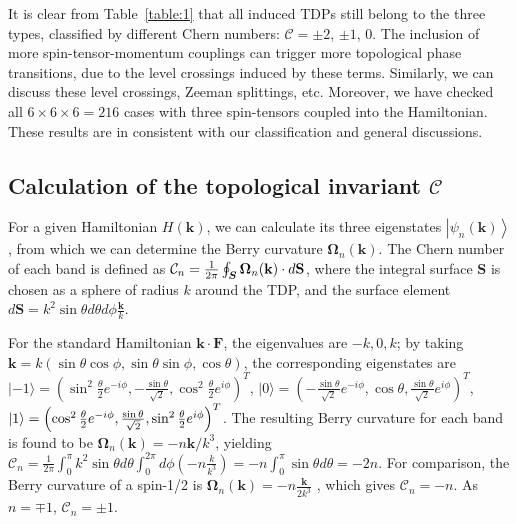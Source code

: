\documentclass[aps,prl,floatfix,twocolumn,reprint]{revtex4}
\begin{document}
It is clear from Table~\ref{table:1} that all induced TDPs still belong to the three
types, classified by different Chern numbers: $\mathcal{C}=\pm 2$, $\pm 1$, $%
0$. The inclusion of more spin-tensor-momentum couplings can trigger more
topological phase transitions, due to the level crossings induced by these
terms. Similarly, we can discuss these level crossings, Zeeman splittings,
etc. Moreover, we have checked all $6\times 6\times 6=216$ cases with three
spin-tensors coupled into the Hamiltonian. These results are in consistent
with our classification and general discussions.

\subsection{Calculation of the topological invariant $\mathcal{C}$}

For a given Hamiltonian $H(\bm{k})$, we can calculate its three eigenstates $%
\left\vert \psi _{n}\left( \bm{k}\right) \right\rangle $, from which we can
determine the Berry curvature $\mathbf{\Omega }_{n}(\mathbf{k})$. The Chern
number of each band is defined as $\mathcal{C}_{n}=\frac{1}{2\pi }\oint_{\bm{S}}\mathbf{%
\Omega }_{n}(\mathbf{k})\cdot d\mathbf{S}$, where the integral surface $%
\mathbf{S}$ is chosen as a sphere of radius $k$ around the TDP, and the
surface element $d\mathbf{S}=k^{2}\sin \theta d\theta d\phi \frac{\mathbf{k}%
}{k}$.

For the standard Hamiltonian $\bm{k}\cdot \bm{F}$, the
eigenvalues are $-k,0,k$; by taking $\bm{k}=k(\sin \theta \cos \phi ,\sin
\theta \sin \phi ,\cos \theta )$, the corresponding eigenstates are $%
|-1\rangle =\left( \sin ^{2}\frac{\theta }{2}e^{-i\phi },-\frac{\sin \theta
}{\sqrt{2}},\cos ^{2}\frac{\theta }{2}e^{i\phi }\right) ^{T}$, $|0\rangle
=\left( -\frac{\sin \theta }{\sqrt{2}}e^{-i\phi },\cos \theta ,\frac{\sin
\theta }{\sqrt{2}}e^{i\phi }\right) ^{T}$, $|1\rangle =\left( \cos ^{2}\frac{%
\theta }{2}e^{-i\phi },\frac{\sin \theta }{\sqrt{2}},\sin ^{2}\frac{\theta }{%
2}e^{i\phi }\right) ^{T}$. The resulting Berry curvature for each band is
found to be $\mathbf{\Omega }_{n}(\mathbf{k})=-n\mathbf{k}/k^{3}$,
yielding $\mathcal{C}_{n}=\frac{1}{2\pi }\int_{0}^{\pi }k^{2}\sin \theta
d\theta \int_{0}^{2\pi }d\phi (-n\frac{k}{k^{3}})=-n\int_{0}^{\pi }\sin
\theta d\theta =-2n$. For comparison, the Berry curvature of a spin-1/2 is $%
\mathbf{\Omega }_{n}(\mathbf{k})=-n\frac{\mathbf{k}}{2k^{3}}$ \cite{book},
which gives $\mathcal{C}_{n}=-n$. As $n=\mp 1$, $\mathcal{C}_{n}=\pm 1$.
\end{document}
